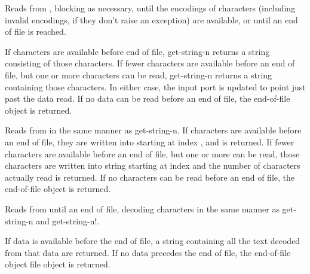 \begin{entry}{%
}
   

Reads from , blocking as necessary, until the
encodings of  characters (including invalid encodings, if they
don't raise an exception) are available, or until an end of
file is reached.
   
If  characters are available before end of file, {\cf
  get-string-n} returns a string consisting of those 
characters. If fewer characters are available before an end of file,
but one or more characters can be read,
{\cf get-string-n} returns a string containing
those characters. In either case, the input port is updated to point
just past the data read. If no data can be read before an 
end of file, the end-of-file object is returned.
\end{entry}

\begin{entry}{%
}


Reads from  in the same manner as {\cf
  get-string-n}.  If  characters are available
before an end of file, they are written into 
starting at index , and  is returned. If fewer
characters are available before an end of file, but one
or more can be read, those characters are written into string
starting at index  and the number of characters actually read is
returned. If no characters can be read before an end of file,
the end-of-file object is returned.
\end{entry}   

\begin{entry}{%
}
   
Reads from  until an end of file, decoding
characters in the same manner as {\cf get-string-n} and {\cf get-string-n!}.
   
If data is available before the end of file, a string
containing all the text decoded from that data are returned. If no data
precedes the end of file, the end-of-file object file object is
returned.
\end{entry}

